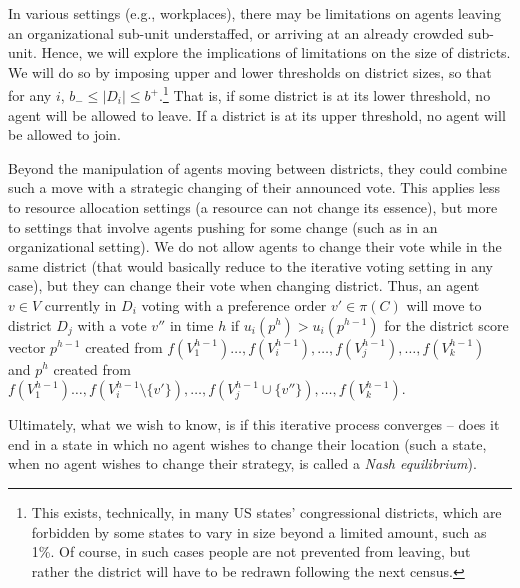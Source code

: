 \documentclass[letterpaper]{article} %
\begin{document}
In various settings (e.g., workplaces), there may be limitations on agents leaving an organizational sub-unit understaffed, or arriving at an already crowded sub-unit. Hence, we will explore the implications of limitations on the size of districts. We will do so by imposing upper and lower thresholds on district sizes, so that for any $i$, $b_{-}\leq |D_{i}|\leq b^{+}$.\footnote{This exists, technically, in many US states' congressional districts, which are forbidden by some states to vary in size beyond a limited amount, such as 1\%. Of course, in such cases people are not prevented from leaving, but rather the district will have to be redrawn following the next census.} That is, if some district is at its lower threshold, no agent will be allowed to leave. If a district is at its upper threshold, no agent will be allowed to join.

Beyond the manipulation of agents moving between districts, they could combine such a move with a strategic changing of their announced vote. This applies less to resource allocation settings (a resource can not change its essence), but more to settings that involve agents pushing for some change (such as in an organizational setting). We do not allow agents to change their vote while in the same district (that would basically reduce to the iterative voting setting in any case), but they can change their vote when changing district. Thus, an agent $v\in V$ currently in $D_{i}$ voting with a preference order $v'\in\pi(C)$ will move to district $D_{j}$ with a vote $v''$ in time $h$ if $u_{i}(p^h)>u_{i}(p^{h-1})$ for the district score vector $p^{h-1}$ created from 
$f(V^{h-1}_{1})\ldots,f(V^{h-1}_{i}),\ldots,f (V^{h-1}_{j}),\ldots,f (V^{h-1}_{k})$ and $p^h$ created from 
$f(V^{h-1}_{1})\ldots,f(V^{h-1}_{i}\setminus \{v'\}),\ldots,f (V^{h-1}_{j}\cup \{v''\}),\ldots,f (V^{h-1}_{k})$.

Ultimately, what we wish to know, is if this iterative process converges -- does it end in a state in which no agent wishes to change their location (such a state, when no agent wishes to change their strategy, is called a \emph{Nash equilibrium}).
\end{document}
